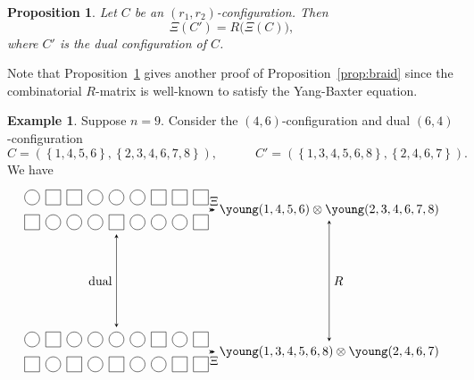 \documentclass[reqno]{amsart}
\newcommand{\0}{\phantom{c}}
\newcommand{\set}[1]{\left\{ #1 \right\}}
\theoremstyle{plain}
\newtheorem{prop}[thm]{Proposition}
\theoremstyle{definition}
\newtheorem{example}[thm]{Example}
\numberwithin{equation}{section}
\begin{document}
\begin{prop}
\label{prop:dual_is_R}
Let $C$ be an $(r_1, r_2)$-configuration. Then
\[
\Xi(C') = R\bigl( \Xi(C) \bigr),
\]
where $C'$ is the dual configuration of $C$.
\end{prop}

Note that Proposition~\ref{prop:dual_is_R} gives another proof of Proposition~\ref{prop:braid} since the combinatorial $R$-matrix is well-known to satisfy the Yang-Baxter equation.

\begin{example}
Suppose $n = 9$.
Consider the $(4,6)$-configuration and dual $(6,4)$-configuration
\[
C = (\set{1,4,5,6}, \set{2,3,4,6,7,8}),
\qquad\quad
C' = (\set{1,3,4,5,6,8}, \set{2,4,6,7}).
\]
We have
\[
\begin{tikzpicture}[xscale=6,yscale=4,>=stealth]
\node (C) at (0,0) { %
\begin{tikzpicture}[scale=0.7]
  \def\sc{0.85}   %
  \def\ll{2}   %
  \def\l{1}   %
  \foreach \i in {1,4,5,6} { \draw[fill=white] (\i*\sc,\ll) circle (0.3); }
  \foreach \i in {2,3,7,8,9} { \draw[fill=white] (\i*\sc-.3,\ll-.3) rectangle +(0.6,+0.6); }
  \foreach \i in {2,3,4,6,7,8} { \draw[fill=white] (\i*\sc,\l) circle (0.3); }
  \foreach \i in {1,5,9} { \draw[fill=white] (\i*\sc-.3,\l-.3) rectangle +(0.6,+0.6); }
\end{tikzpicture}
};
\node (Cp) at (0,-1) { %
\begin{tikzpicture}[scale=0.7]
  \def\sc{0.85}   %
  \def\ll{2}   %
  \def\l{1}   %
  \foreach \i in {1,3,4,5,6,8} { \draw[fill=white] (\i*\sc,\ll) circle (0.3); }
  \foreach \i in {2,7,9} { \draw[fill=white] (\i*\sc-.3,\ll-.3) rectangle +(0.6,+0.6); }
  \foreach \i in {2,4,6,7} { \draw[fill=white] (\i*\sc,\l) circle (0.3); }
  \foreach \i in {1,3,5,8,9} { \draw[fill=white] (\i*\sc-.3,\l-.3) rectangle +(0.6,+0.6); }
\end{tikzpicture}
};
\node (KR) at (1,0) {$\young(1,4,5,6) \otimes \young(2,3,4,6,7,8)$};
\node (KRp) at (1,-1) {$\young(1,3,4,5,6,8) \otimes \young(2,4,6,7)$};
\draw[<->] (C) -- (Cp) node[midway,anchor=east] {dual};
\draw[<->] (C) -- (KR) node[midway,anchor=south] {$\Xi$};
\draw[<->] (KR) -- (KRp) node[midway,anchor=west] {$R$};
\draw[<->] (Cp) -- (KRp) node[midway,anchor=north] {$\Xi$};
\end{tikzpicture}
\]
\end{example}
\end{document}
